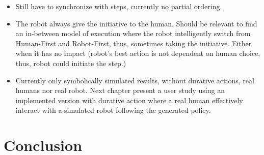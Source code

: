 \begin{itemize}
    \item Still have to synchronize with steps, currently no partial ordering. 
    \item The robot always give the initiative to the human. Should be relevant to find an in-between model of execution where the robot intelligently switch from Human-First and Robot-First, thus, sometimes taking the initiative. Either when it has no impact (robot's best action is not dependent on human choice, thus, robot could initiate the step.)
    \item Currently only symbolically simulated results, without durative actions, real humans nor real robot. Next chapter present a user study using an implemented version with durative action where a real human effectively interact with a simulated robot following the generated policy. 
\end{itemize}


\section{Conclusion}




